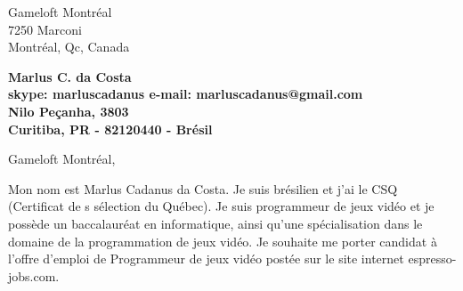 \documentclass[11pt]{letter} %
\begin{document}

\begin{letter}{Gameloft Montréal \\
7250 Marconi \\
Montréal, Qc, Canada} 



\begin{center}
\large\bf Marlus C. da Costa \\ %
skype: marluscadanus e-mail: marluscadanus@gmail.com \\
Nilo Peçanha, 3803 \\ Curitiba, PR - 82120440 - Brésil
\end{center} 
\vfill

\signature{Marlus C. da Costa} %


\opening{Gameloft Montréal,} 


Mon nom est Marlus Cadanus da Costa. Je suis brésilien et j’ai le CSQ (Certificat de s sélection du Québec). Je suis programmeur de jeux vidéo et je possède un baccalauréat en informatique, ainsi qu’une spécialisation dans le domaine de la programmation de jeux vidéo. Je souhaite me porter candidat à l’offre d’emploi de Programmeur de jeux vidéo postée sur le site internet espresso-jobs.com.


\end{letter}
\end{document}
